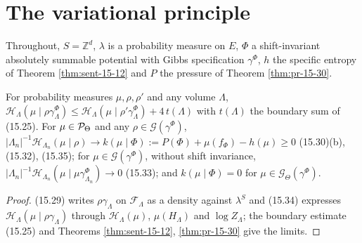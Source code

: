\section{The variational principle}

Throughout, $S = \mathbb Z^d$, $\lambda$ is a probability measure on $E$, $\Phi$ a
shift-invariant absolutely summable potential with Gibbs specification $\gamma^\Phi$, $h$ the
specific entropy of Theorem \ref{thm:sent-15-12} and $P$ the pressure of Theorem
\ref{thm:pr-15-30}.

\begin{proposition}[Georgii (15.28)--(15.30)(b), (15.33)--(15.35)]
    \label{prop:vp-15-30b}
    \leanok

    For probability measures $\mu, \rho, \rho'$ and any volume $\Lambda$,
    $\mathcal H_\Lambda(\mu \mid \rho\gamma^\Phi_\Lambda) \leq \mathcal H_\Lambda(\mu \mid \rho'\gamma^\Phi_\Lambda) + 4\, t(\Lambda)$
    with $t(\Lambda)$ the boundary sum of (15.25). For $\mu \in \mathcal{P}_\Theta$ and any
    $\rho \in \mathcal G(\gamma^\Phi)$,
    $|\Lambda_n|^{-1}\mathcal H_{\Lambda_n}(\mu \mid \rho) \to k(\mu \mid \Phi) := P(\Phi) + \mu(f_\Phi) - h(\mu) \geq 0$
    (15.30)(b), (15.32), (15.35); for $\mu \in \mathcal G(\gamma^\Phi)$, without shift invariance,
    $|\Lambda_n|^{-1}\mathcal H_{\Lambda_n}(\mu \mid \mu\gamma^\Phi_{\Lambda_n}) \to 0$ (15.33); and
    $k(\mu \mid \Phi) = 0$ for $\mu \in \mathcal G_\Theta(\gamma^\Phi)$.
\end{proposition}
\begin{proof}
    \leanok
    (15.29) writes $\rho\gamma_\Lambda$ on $\mathcal F_\Lambda$ as a density against $\lambda^S$
    and (15.34) expresses $\mathcal H_\Lambda(\mu \mid \rho\gamma_\Lambda)$ through
    $\mathcal H_\Lambda(\mu)$, $\mu(H_\Lambda)$ and $\log Z_\Lambda$; the boundary estimate
    (15.25) and Theorems \ref{thm:sent-15-12}, \ref{thm:pr-15-30} give the limits.
\end{proof}

